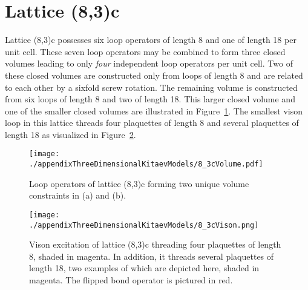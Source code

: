 \section{Lattice (8,3)c}
\label{appendix:ThreeDimensionalKitaevModels_8_3c}
%
%
Lattice (8,3)c possesses six loop operators of length 8 and one of length 18 per unit cell.
These seven loop operators may be combined to form three closed volumes leading to only \textit{four} independent loop operators per unit cell.
Two of these closed volumes are constructed only from loops of length 8 and are related to each other by a sixfold screw rotation.
The remaining volume is constructed from six loops of length 8 and two of length 18.
This larger closed volume and one of the smaller closed volumes are illustrated in Figure~\ref{fig:appendix_8_3cVolume}.
The smallest vison loop in this lattice threads four plaquettes of length 8 and several plaquettes of length 18 as visualized in Figure~\ref{fig:appendix_8_3cVison}.
%
\begin{figure}[ht!]
	\centering
	\texttt{[image: ./appendixThreeDimensionalKitaevModels/8\_3cVolume.pdf]}
	\caption{
		Loop operators of lattice (8,3)c forming two unique volume constraints in (a) and (b).
	}
	\label{fig:appendix_8_3cVolume}
\end{figure}
%
%
\begin{figure}[ht!]
	\centering
	\texttt{[image: ./appendixThreeDimensionalKitaevModels/8\_3cVison.png]}
	\caption{
		Vison excitation of lattice (8,3)c threading four plaquettes of length 8, shaded in magenta.
		In addition, it threads several plaquettes of length 18, two examples of which are depicted here, shaded in magenta.
		The flipped bond operator is pictured in red.
	}
	\label{fig:appendix_8_3cVison}
\end{figure}
%


%
%
